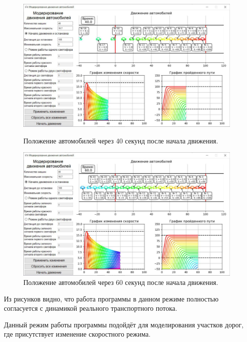 \documentclass[12pt, a4paper]{extarticle}
\numberwithin{equation}{section}
\numberwithin{figure}{section}
\begin{document}
\begin{figure}[h!]
\begin{center}
\begin{minipage}[h]{0.48\linewidth}
			\label{first_mode_2}
		\end{minipage}
		\hfill 
		\begin{minipage}[h]{0.48\linewidth}
			\includegraphics[width=1\linewidth]
			{Images/screens/first_mode_3}
			\caption{Положение автомобилей через 40 секунд после начала движения.}
			\label{first_mode_3}
		\end{minipage}
			\hfill 
		\begin{minipage}[h]{0.48\linewidth}
			\includegraphics[width=1\linewidth]
			{Images/screens/first_mode_4}
			\caption{Положение автомобилей через 60 секунд после начала движения.}
			\label{first_mode_4}
		\end{minipage}
	\end{center}
\end{figure}

Из рисунков видно, что работа программы в данном режиме полностью согласуется с динамикой реального транспортного потока.

Данный режим работы программы подойдёт для моделирования участков дорог, где присутствует изменение скоростного режима.
\end{document}
